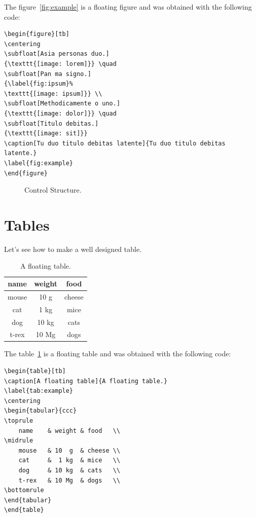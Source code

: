 The figure~\ref{fig:example} is a floating figure and was obtained with the following code:
\begin{lstlisting}
\begin{figure}[tb]
\centering
\subfloat[Asia personas duo.]
{\texttt{[image: lorem]}} \quad
\subfloat[Pan ma signo.]
{\label{fig:ipsum}%
\texttt{[image: ipsum]}} \\
\subfloat[Methodicamente o uno.]
{\texttt{[image: dolor]}} \quad
\subfloat[Titulo debitas.]
{\texttt{[image: sit]}}
\caption[Tu duo titulo debitas latente]{Tu duo titulo debitas latente.}
\label{fig:example}
\end{figure}
\end{lstlisting}

\begin{figure}[t]
    \centering
    \label{fig:control_diagram}
    \caption{Control Structure.}
\end{figure}

\lipsum[3-8]

\section{Tables}
Let's see how to make a well designed table.

\begin{table}[tb]
    \caption[A floating table]{A floating table.}
    \label{tab:example}
    \centering
    \begin{tabular}{ccc}
        \toprule
        name  & weight & food   \\
        \midrule
        mouse & 10 g   & cheese \\
        cat   & 1 kg   & mice   \\
        dog   & 10 kg  & cats   \\
        t-rex & 10 Mg  & dogs   \\
        \bottomrule
    \end{tabular}
\end{table}

The table~\ref{tab:example} is a floating table and was obtained with the following code:
\begin{lstlisting}
\begin{table}[tb]
\caption[A floating table]{A floating table.}
\label{tab:example}
\centering
\begin{tabular}{ccc}
\toprule
	name 	& weight & food	  \\ 
\midrule
	mouse	& 10  g	 & cheese \\
	cat		&  1 kg	 & mice	  \\
	dog		& 10 kg	 & cats   \\
	t-rex	& 10 Mg	 & dogs	  \\
\bottomrule 
\end{tabular}
\end{table}
\end{lstlisting}

\lipsum[1-2]

\begin{table}[t]
    \centering
    \vspace{2mm}
    \caption{Some other more elaborated table.}
    \label{tab:hd_results}
\end{table}